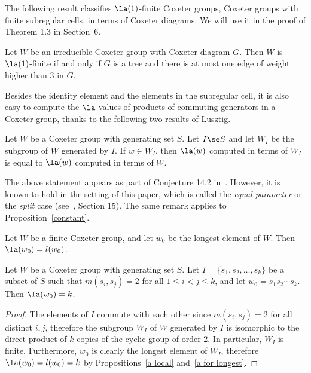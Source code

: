 The following result classifies $\la(1)$-finite Coxeter groups, \ie Coxeter
groups with finite subregular cells, in
terms of Coxeter diagrams. We will use it in the proof of Theorem
1.3 in Section~6.
\begin{prop}
 \label{tree}
 Let $W$ be an irreducible Coxeter group with Coxeter diagram $G$. Then $W$ is
 $\la(1)$-finite if and
 only if $G$ is a tree and there is at most one edge of weight higher than 3
 in $G$.
\end{prop}
\noindent 

Besides the identity element and the elements in the subregular cell, it is
also easy to compute the $\la$-values
of products of commuting generators in a 
Coxeter group, thanks to the following two results of Lusztig.
\begin{prop}[{\cite[Section 14]{LG}}]
 \label{a local}
 Let $W$ be a Coxeter group with generating set $S$. Let $I\se S$ and let $W_I$ be the subgroup of $W$ generated by
 $I$. If $w\in W_I$, then $\la(w)$ computed in terms of $W_I$ is equal to
 $\la(w)$ computed in terms of $W$.
\end{prop}

\begin{rema}
 The above statement appears as part of Conjecture 14.2 in~\cite{LG}. However, it is
 known to hold in the setting of this paper, which is called the
 \emph{equal parameter} or the \emph{split} case (see~\cite{LG}, Section 15).
 The same remark applies to Proposition~\ref{constant}.
\end{rema}

\begin{prop}[{\cite[Proposition~13.8]{LG}}]
 \label{a for longest}
 Let $W$ be a finite Coxeter group, and let
 $w_0$ be the longest element of $W$. Then $\la(w_0)=l(w_0)$.
\end{prop}

\begin{coro}
 \label{product a}
 Let $W$ be a Coxeter group with generating set $S$. Let $I=\{s_1,s_2,\ldots,
 s_k\}$
 be a subset of $S$ such that $m(s_i,s_j)=2$ for all $1\le i<j\le k$, and let
 $w_0=s_1s_2\cdots s_k$. Then $\la(w_0)=k$.
\end{coro}
\begin{proof}
 The elements of $I$ commute with each other since $m(s_i,s_j)=2$
 for all distinct $i,j$, therefore the subgroup $W_I$ of $W$ generated by
 $I$ is isomorphic to the direct product of $k$ copies of the cyclic group of
 order 2. In particular, $W_I$ is finite. Furthermore, $w_0$ is clearly the
 longest element of $W_I$, therefore $\la(w_0)=l(w_0)=k$ by Propositions~\ref{a local} and~\ref{a for longest}.
\end{proof}


